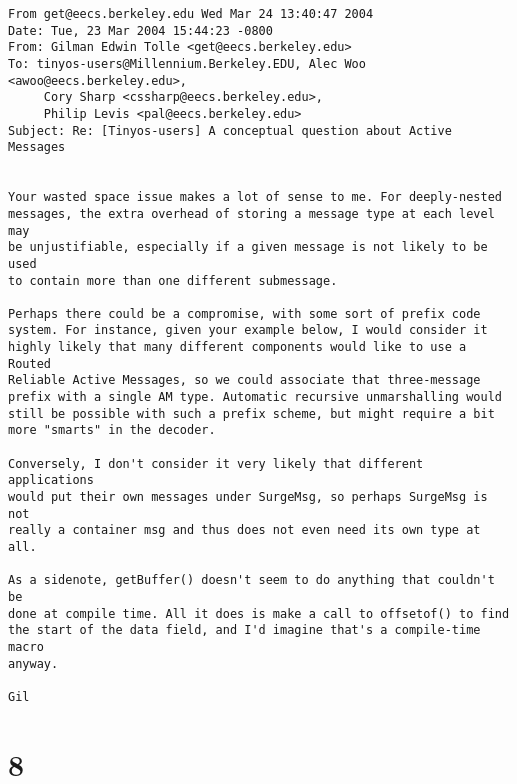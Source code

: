 \documentclass[10pt]{article}
\begin{document}
\begin{verbatim}
From get@eecs.berkeley.edu Wed Mar 24 13:40:47 2004
Date: Tue, 23 Mar 2004 15:44:23 -0800
From: Gilman Edwin Tolle <get@eecs.berkeley.edu>
To: tinyos-users@Millennium.Berkeley.EDU, Alec Woo <awoo@eecs.berkeley.edu>,
     Cory Sharp <cssharp@eecs.berkeley.edu>,
     Philip Levis <pal@eecs.berkeley.edu>
Subject: Re: [Tinyos-users] A conceptual question about Active Messages


Your wasted space issue makes a lot of sense to me. For deeply-nested 
messages, the extra overhead of storing a message type at each level may 
be unjustifiable, especially if a given message is not likely to be used 
to contain more than one different submessage.

Perhaps there could be a compromise, with some sort of prefix code 
system. For instance, given your example below, I would consider it 
highly likely that many different components would like to use a Routed 
Reliable Active Messages, so we could associate that three-message 
prefix with a single AM type. Automatic recursive unmarshalling would 
still be possible with such a prefix scheme, but might require a bit 
more "smarts" in the decoder.

Conversely, I don't consider it very likely that different applications 
would put their own messages under SurgeMsg, so perhaps SurgeMsg is not 
really a container msg and thus does not even need its own type at all.

As a sidenote, getBuffer() doesn't seem to do anything that couldn't be 
done at compile time. All it does is make a call to offsetof() to find 
the start of the data field, and I'd imagine that's a compile-time macro 
anyway.

Gil

\end{verbatim}

\section*{8}
\end{document}
